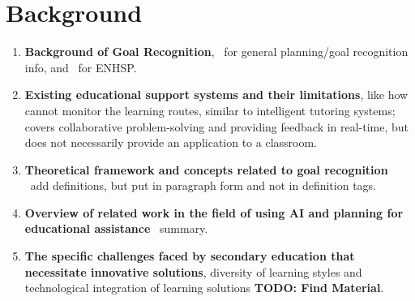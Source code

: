 \section{Background}
\begin{enumerate}
    \item \textbf{Background of Goal Recognition},~\citet{meneguzzi2021survey} for general planning/goal recognition info, and~\citet{Scala2016,ScalaHaslum2016} for ENHSP\@.
    \item \textbf{Existing educational support systems and their limitations}, like how~\citet{Garrido2009} cannot monitor the learning routes, similar to intelligent tutoring systems;~\citet{Rojas2022} covers collaborative problem-solving and providing feedback in real-time, but does not necessarily provide an application to a classroom.
    \item \textbf{Theoretical framework and concepts related to goal recognition} \textemdash~add definitions, but put in paragraph form and not in definition tags.
    \item \textbf{Overview of related work in the field of using AI and planning for educational assistance}~\cite{Castillo2009} summary.
    \item \textbf{The specific challenges faced by secondary education that necessitate innovative solutions}, diversity of learning styles and technological integration of learning solutions \textbf{TODO: Find Material}.
\end{enumerate}
